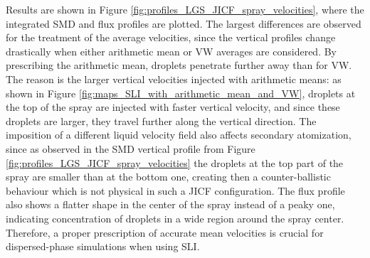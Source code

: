 \clearpage

Results are shown in Figure \ref{fig:profiles_LGS_JICF_spray_velocities}, where the integrated SMD and flux profiles are plotted. The largest differences are observed for the treatment of the average velocities, since the vertical profiles change drastically when either arithmetic mean or VW averages are considered. By prescribing the arithmetic mean, droplets penetrate further away than for VW. The reason is the larger vertical velocities injected with arithmetic means: as shown in Figure \ref{fig:maps_SLI_with_arithmetic_mean_and_VW}, droplets at the top of the spray are injected with faster vertical velocity, and since these droplets are larger, they travel further along the vertical direction. The imposition of a different liquid velocity field also affects secondary atomization, since as observed in the SMD vertical profile from Figure \ref{fig:profiles_LGS_JICF_spray_velocities} the droplets at the top part of the spray are smaller than at the bottom one, creating then a counter-ballistic behaviour which is not physical in such a JICF configuration. The flux profile also shows a flatter shape in the center of the spray instead of a peaky one, indicating concentration of droplets in a wide region around the spray center. Therefore, a proper prescription of accurate mean velocities is crucial for dispersed-phase simulations when using SLI. 


